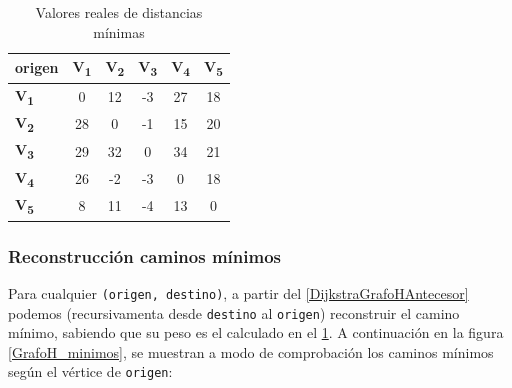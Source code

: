 \documentclass[../tp2_grupo404.tex]{subfiles}
\begin{document}
\begin{table}[H]
    \centering
    \begin{tabular}{@{}lccccc@{}}
    \toprule
    \textbf{origen} & \textbf{V\textsubscript{1}} & \textbf{V\textsubscript{2}} & \textbf{V\textsubscript{3}} & \textbf{V\textsubscript{4}} & \textbf{V\textsubscript{5}} \\ \midrule
    \textbf{V\textsubscript{1}}  &  0  & 12  & -3  & 27  & 18  \\
    \textbf{V\textsubscript{2}}  & 28  &  0  & -1  & 15  & 20  \\
    \textbf{V\textsubscript{3}}  & 29  & 32  &  0  & 34  & 21  \\
    \textbf{V\textsubscript{4}}  & 26  & -2  & -3  &  0  & 18  \\
    \textbf{V\textsubscript{5}}  &  8  & 11  & -4  & 13  &  0  \\ \bottomrule
    \end{tabular}
    \caption{Valores reales de distancias mínimas}
    \label{AjusteJohnsonValores}
\end{table}
    
\subsubsection{Reconstrucción caminos mínimos}\label{sec:parte1_4_4}

Para cualquier \texttt{(origen, destino)}, a partir del \cref{DijkstraGrafoHAntecesor}
podemos (recursivamenta desde \texttt{destino} al \texttt{origen})
reconstruir el camino mínimo, sabiendo que su peso es el calculado
en el \cref{AjusteJohnsonValores}. A continuación en la figura
\cref{GrafoH_minimos}, se muestran a modo de comprobación los
caminos mínimos según el vértice de \texttt{origen}:
\end{document}
